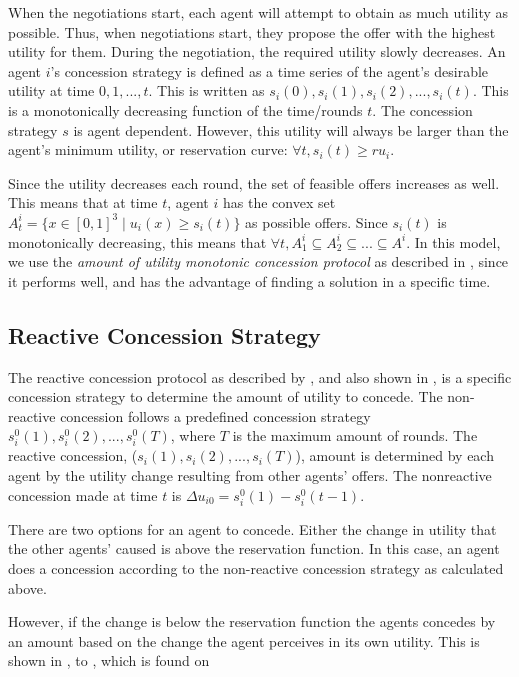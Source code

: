 When the negotiations start, each agent will attempt to obtain as much utility as possible. Thus, when negotiations start, they propose the offer with the highest utility for them. During the negotiation, the required utility slowly decreases. An agent $i$'s concession strategy is defined as a time series of the agent's desirable utility at time $0,1,...,t$. This is written as $s_i(0), s_i(1), s_i(2),..., s_i(t)$.  This is a monotonically decreasing function of the time/rounds $t$. The concession strategy $s$ is agent dependent. However, this utility will always be larger than the agent's minimum utility, or reservation curve: $ \forall t, s_i(t) \geq ru_i$.

Since the utility decreases each round, the set of feasible offers increases as well. This means that at time $t$, agent $i$ has the convex set $A^i_t = \{x\in [0,1]^3 \mid u_i(x) \geq s_i(t)   \}$ as possible offers. Since $s_i(t)$ is monotonically decreasing, this means that $\forall t, A^i_1\subseteq A^i_2 \subseteq ... \subseteq A^i$. In this model, we use the \textit{amount of utility monotonic concession protocol} as described in , since it performs well, and has the advantage of finding a solution in a specific time.

\subsection{Reactive Concession Strategy}
\label{sec:reactiveconcessionstr}
The reactive concession protocol as described by \citet{zheng2015automated}, and also shown in , is a specific concession strategy to determine the amount of utility to concede. The non-reactive concession follows a predefined concession strategy $s_i^0(1), s_i^0(2),...,s_i^0(T)$, where $T$ is the maximum amount of rounds. The reactive concession, ($s_i(1), s_i(2),..., s_i(T)$), amount is determined by each agent by the utility change resulting from other agents' offers. The nonreactive concession made at time $t$ is $\Delta u_{i0} = s^0_i(1)-s^0_i(t-1)$.

There are two options for an agent to concede. Either the change in utility that the other agents' caused is above the reservation function. In this case, an agent does a concession according to the non-reactive concession strategy as calculated above. 


 However, if the change is below the reservation function the agents concedes by an amount based on the change the agent perceives in its own utility. This is shown in ,   to , which is found on 
 
